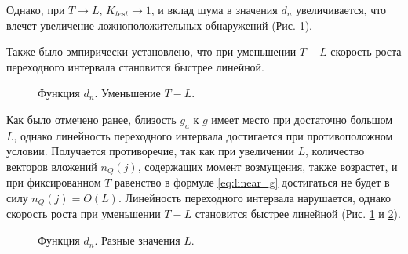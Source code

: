 \documentclass[specialist, substylefile = spbu.rtx,
			   subf, href, 12pt]{disser}
\begin{document}
Однако, при $ T \rightarrow L $, $ K_{test} \rightarrow 1 $, и вклад шума в значения $ d_n $ увеличивается, что влечет увеличение ложноположительных обнаружений (Рис. \ref{pic:decreasing_T}). 

Также было эмпирически установлено, что при уменьшении $ T - L $ скорость роста переходного интервала становится быстрее линейной.

\begin{figure}[!hhh]
	\caption{Функция $ d_n $. Уменьшение $ T - L $.}
	\label{pic:decreasing_T}
\end{figure}

Как было отмечено ранее, близость $ g_a $ к $ g $ имеет место при достаточно большом $ L $, однако линейность переходного интервала достигается при противоположном условии. Получается противоречие, так как при увеличении $ L $, количество векторов вложений $ n_Q(j) $, содержащих момент возмущения, также возрастет, и при фиксированном $ T $ равенство в формуле \eqref{eq:linear_g} достигаться не будет в силу $ n_Q(j) = O(L) $. Линейность переходного интервала нарушается, однако скорость роста при уменьшении $ T - L $ становится быстрее линейной (Рис. \ref{pic:decreasing_T} и \ref{pic:row_diff_L}). 

\begin{figure}[!hhh]
	\caption{Функция $ d_n $. Разные значения $ L $.}
	\label{pic:row_diff_L}
\end{figure}
\end{document}
